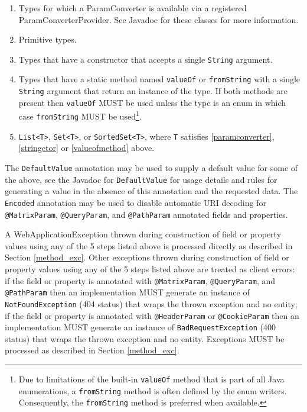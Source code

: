 \begin{enumerate}
    \item\label{paramconverter} Types for which a ParamConverter is available via a registered ParamConverterProvider.
    See Javadoc for these classes for more information.
    \item Primitive types.
    \item\label{stringctor} Types that have a constructor that accepts a single \lstinline{String} argument.
    \item\label{valueofmethod} Types that have a static method named \lstinline{valueOf} or \lstinline{fromString} with
    a single \lstinline{String} argument that return an instance of the type. If both methods are present then
    \lstinline{valueOf} MUST be used unless the type is an enum in which case \lstinline{fromString} MUST be
    used\footnote{Due to limitations of the built-in \lstinline{valueOf} method that is part of all Java enumerations, a
    \lstinline{fromString} method is often defined by the enum writers. Consequently, the \lstinline{fromString} method
    is preferred when available.}.
    \item \lstinline{List<T>}, \lstinline{Set<T>}, or \lstinline{SortedSet<T>}, where \lstinline{T} satisfies
    \ref{paramconverter}, \ref{stringctor} or \ref{valueofmethod} above.
\end{enumerate}

The \lstinline{DefaultValue} annotation may be used to supply a default value for some of the above, see the Javadoc for
\lstinline{DefaultValue} for usage details and rules for generating a value in the absence of this annotation and the
requested data. The \lstinline{Encoded} annotation may be used to disable automatic URI decoding for
\lstinline{@MatrixParam}, \lstinline{@QueryParam}, and \lstinline{@PathParam} annotated fields and properties.

A WebApplicationException thrown during construction of field or property values using any of the 5 steps listed above
is processed directly as described in Section \ref{method_exc}. Other exceptions thrown during construction of field or
property values using any of the 5 steps listed above are treated as client errors: if the field or property is
annotated with \lstinline{@MatrixParam}, \lstinline{@QueryParam}, and \lstinline{@PathParam} then an implementation MUST
generate an instance of \lstinline{NotFoundException} (404 status) that wraps the thrown exception and no entity; if the
field or property is annotated with \lstinline{@HeaderParam} or \lstinline{@CookieParam} then an implementation MUST
generate an instance of \lstinline{BadRequestException} (400 status) that wraps the thrown exception and no entity.
Exceptions MUST be processed as described in Section \ref{method_exc}.

